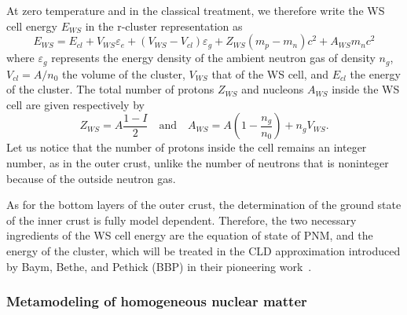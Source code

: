 At zero temperature and in the classical treatment, we therefore write 
the WS cell energy $E_{WS}$ in the r-cluster representation as
%
\begin{equation}
  E_{WS} = E_{cl} + V_{WS}\varepsilon_e +
  (V_{WS}-V_{cl})\varepsilon_g + Z_{WS}(m_p - m_n)c^2 + A_{WS}m_nc^2\label{eq:ews_icrust}
\end{equation}
%
where $\varepsilon_g$ represents the energy density of the ambient neutron gas
of density $n_g$, $V_{cl}=A/n_0$ the volume of the cluster, $V_{WS}$ that of
the WS cell, and $E_{cl}$ the energy of the cluster. The total number of
protons $Z_{WS}$ and nucleons $A_{WS}$ inside the WS cell are given respectively by
%
\begin{equation}
  Z_{WS} = A\frac{1-I}{2} \quad \text{and} \quad A_{WS} =
  A\left(1-\frac{n_g}{n_0}\right) + n_gV_{WS}.
\end{equation}
%
Let us notice that the number of protons inside the cell remains an
integer number, as in the outer crust, unlike the number of neutrons that is
noninteger because of the outside neutron gas.

As for the bottom layers of the outer crust, the determination of the ground 
state of the inner crust is fully model dependent.
Therefore, the two necessary ingredients of the WS cell energy are the 
equation of state of PNM, and the energy of the cluster, 
which will be treated in the CLD approximation 
introduced by Baym, Bethe, and Pethick (BBP) in their pioneering work~\cite{BBP}.

\subsubsection{Metamodeling of homogeneous nuclear matter}\label{subsubsec:hnm}


